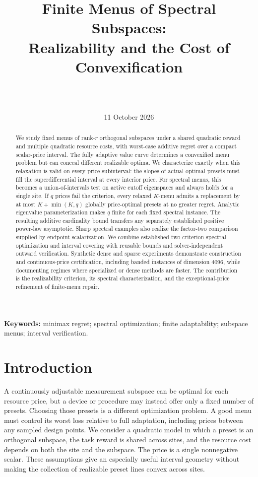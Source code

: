 \documentclass[11pt]{article}
\title{Finite Menus of Spectral Subspaces:\\Realizability and the Cost of Convexification}
\author{\AuthorName\\{\AuthorAffiliation}\\{\small\CorrespondingEmail}}
\date{11 October 2026}
\begin{document}
\maketitle
\begin{abstract}
We study fixed menus of rank-$r$ orthogonal subspaces under a shared
quadratic reward and multiple quadratic resource costs, with worst-case
additive regret over a compact scalar-price interval. The fully adaptive
value curve determines a convexified menu problem but can conceal different
realizable optima. We characterize exactly when this relaxation is valid
on every price subinterval: the slopes of actual optimal presets must fill
the superdifferential interval at every interior price. For spectral menus,
this becomes a union-of-intervals test on active cutoff eigenspaces and
always holds for a single site. If $q$ prices fail the criterion, every
relaxed $K$-menu admits a replacement by at most $K+\min(K,q)$ globally
price-optimal presets at no greater regret. Analytic eigenvalue
parameterization makes $q$ finite for each fixed spectral instance.
The resulting additive cardinality bound transfers any separately
established positive power-law asymptotic. Sharp spectral examples also
realize the factor-two comparison supplied by endpoint scalarization.
We combine established two-criterion spectral optimization and interval
covering with reusable bounds and solver-independent outward verification.
Synthetic dense and sparse experiments demonstrate construction and
continuous-price certification, including banded instances of dimension
4096, while documenting regimes where specialized or dense methods are
faster. The contribution is the realizability criterion, its spectral
characterization, and the exceptional-price refinement of finite-menu repair.
\end{abstract}
\noindent\textbf{Keywords:} minimax regret; spectral optimization; finite
adaptability; subspace menus; interval verification.

\section{Introduction}
A continuously adjustable measurement subspace can be optimal for each
resource price, but a device or procedure may instead offer only a fixed
number of presets. Choosing those presets is a different optimization
problem. A good menu must control its worst loss relative to full adaptation,
including prices between any sampled design points. We consider a quadratic
model in which a preset is an orthogonal subspace, the task reward is shared
across sites, and the resource cost depends on both the site and the subspace.
The price is a single nonnegative scalar. These assumptions give an
especially useful interval geometry without making the collection of
realizable preset lines convex across sites.
\end{document}
